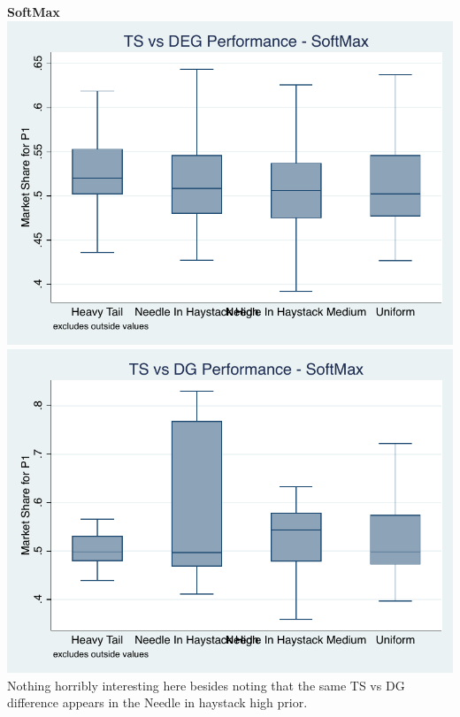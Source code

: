 \documentclass[11pt,letterpaper]{article}
\begin{document}
\pagebreak
\textbf{SoftMax} \\
\includegraphics[scale=0.9]{sm_ts_deg_prior} \\
\includegraphics[scale=0.9]{sm_ts_dg_prior} \\
Nothing horribly interesting here besides noting that the same TS vs DG difference appears in the Needle in haystack high prior.
\end{document}
